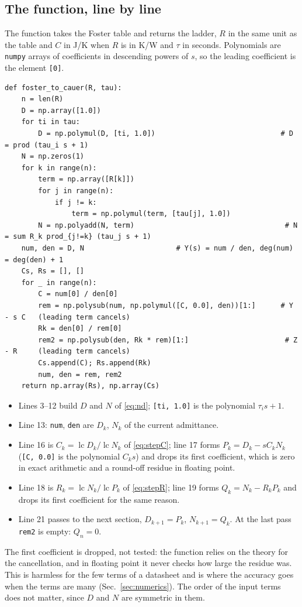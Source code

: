 \documentclass[10pt,a4paper]{scrartcl}
\newcommand{\lc}{\operatorname{lc}}
\newcommand{\code}[1]{\texttt{#1}}
\begin{document}
\subsection{The function, line by line}
\label{sec:code}
The function takes the Foster table and returns the ladder, $R$ in the same unit as the table and $C$ in J/K when $R$ is in K/W and $\tau$ in seconds. Polynomials are \code{numpy} arrays of coefficients in descending powers of $s$, so the leading coefficient is the element \code{[0]}.
\begin{lstlisting}
def foster_to_cauer(R, tau):
    n = len(R)
    D = np.array([1.0])
    for ti in tau:
        D = np.polymul(D, [ti, 1.0])                              # D = prod (tau_i s + 1)
    N = np.zeros(1)
    for k in range(n):
        term = np.array([R[k]])
        for j in range(n):
            if j != k:
                term = np.polymul(term, [tau[j], 1.0])
        N = np.polyadd(N, term)                                    # N = sum R_k prod_{j!=k} (tau_j s + 1)
    num, den = D, N                      # Y(s) = num / den, deg(num) = deg(den) + 1
    Cs, Rs = [], []
    for _ in range(n):
        C = num[0] / den[0]
        rem = np.polysub(num, np.polymul([C, 0.0], den))[1:]      # Y - s C   (leading term cancels)
        Rk = den[0] / rem[0]
        rem2 = np.polysub(den, Rk * rem)[1:]                       # Z - R     (leading term cancels)
        Cs.append(C); Rs.append(Rk)
        num, den = rem, rem2
    return np.array(Rs), np.array(Cs)
\end{lstlisting}
\begin{itemize}
\item Lines 3--12 build $D$ and $N$ of \eqref{eq:nd}; \code{[ti, 1.0]} is the polynomial $\tau_i s + 1$.
\item Line 13: \code{num}, \code{den} are $D_k$, $N_k$ of the current admittance.
\item Line 16 is $C_k = \lc D_k/\lc N_k$ of \eqref{eq:stepC}; line 17 forms $P_k = D_k - sC_kN_k$ (\code{[C, 0.0]} is the polynomial $C_k s$) and drops its first coefficient, which is zero in exact arithmetic and a round-off residue in floating point.
\item Line 18 is $R_k = \lc N_k/\lc P_k$ of \eqref{eq:stepR}; line 19 forms $Q_k = N_k - R_kP_k$ and drops its first coefficient for the same reason.
\item Line 21 passes to the next section, $D_{k+1} = P_k$, $N_{k+1} = Q_k$. At the last pass \code{rem2} is empty: $Q_n = 0$.
\end{itemize}
The first coefficient is dropped, not tested: the function relies on the theory for the cancellation, and in floating point it never checks how large the residue was. This is harmless for the few terms of a datasheet and is where the accuracy goes when the terms are many (Sec.~\ref{sec:numerics}). The order of the input terms does not matter, since $D$ and $N$ are symmetric in them.
\end{document}

